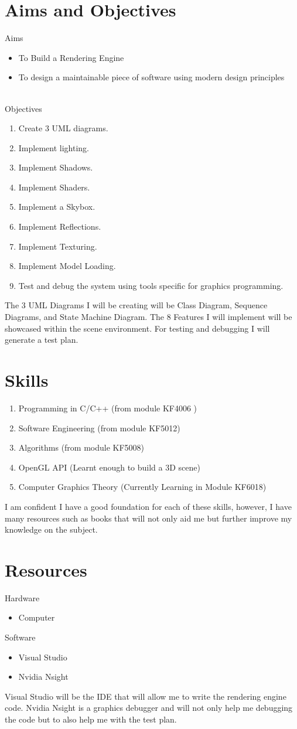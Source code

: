 \documentclass[]{article}
\begin{document}
\section{Aims and Objectives}
Aims
\begin{itemize}
  \item To Build a Rendering Engine
  \item To design a maintainable piece of software using modern design principles
\end{itemize}
\\
Objectives
\begin{enumerate}
  \item Create 3 UML diagrams.
  \item Implement lighting.
  \item Implement Shadows.
  \item Implement Shaders.
  \item Implement a Skybox.
  \item Implement Reflections.
  \item Implement Texturing.
  \item Implement Model Loading.
  \item Test and debug the system using tools specific for graphics programming.  
\end{enumerate}
The 3 UML Diagrams I will be creating will be Class Diagram, Sequence Diagrams, and State Machine Diagram. The 8 Features I will implement will be showcased within the scene environment. For testing and debugging I will generate a test plan.
\section{Skills}
\begin{enumerate}
    \item Programming in C/C++ (from module KF4006 )
    \item Software Engineering (from module KF5012)
    \item Algorithms (from module KF5008) 
    \item OpenGL API (Learnt enough to build a 3D scene) 
    \item Computer Graphics Theory (Currently Learning in Module KF6018)
\end{enumerate}
I am confident I have a good foundation for each of these skills, however, I have many resources such as books that will not only aid me but further improve my knowledge on the subject. 
\section{Resources}
Hardware
\begin{itemize}
  \item Computer
  
\end{itemize}
Software
\begin{itemize}
  \item Visual Studio
  \item Nvidia Nsight
\end{itemize}
Visual Studio will be the IDE that will allow me to write the rendering engine code.
Nvidia Nsight is a graphics debugger and will not only help me debugging the code but to also help me with the test plan.
\end{document}
